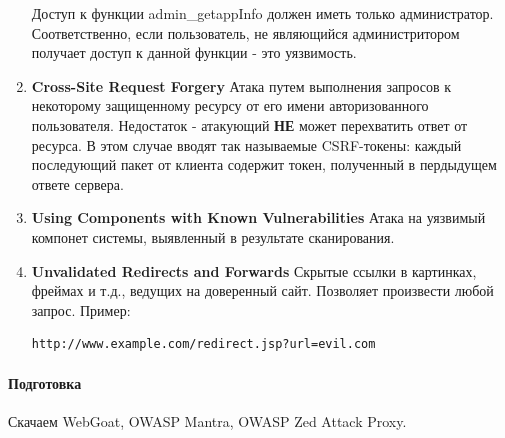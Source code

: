 \documentclass[10pt,a4paper]{article}
\begin{document}
\begin{enumerate}
Доступ к функции admin\_getappInfo должен иметь только администратор. Соответственно, если пользователь, не являющийся администритором получает доступ к данной функции - это уязвимость.

\item \textbf{Cross-Site Request Forgery} Атака путем выполнения запросов к некоторому защищенному ресурсу от его имени авторизованного пользователя. Недостаток - атакующий \textbf{НЕ} может перехватить ответ от ресурса. В этом случае вводят так называемые CSRF-токены: каждый последующий пакет от клиента содержит токен, полученный в пердыдущем ответе сервера.

\item \textbf{Using Components with Known Vulnerabilities} Атака на уязвимый компонет системы, выявленный в результате сканирования.

\item \textbf{Unvalidated Redirects and Forwards} Скрытые ссылки в картинках, фреймах и т.д., ведущих на доверенный сайт. Позволяет произвести любой запрос.
Пример:
\begin{verbatim}
http://www.example.com/redirect.jsp?url=evil.com
\end{verbatim}
\end{enumerate}

\paragraph{Подготовка}
Скачаем WebGoat, OWASP Mantra, OWASP Zed Attack Proxy. 
\end{document}

